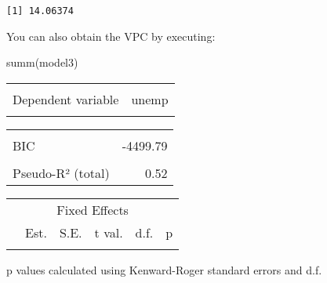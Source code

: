 \documentclass[
  letterpaper,
  krantz2]{style/krantz}
\newenvironment{Shaded}{\begin{snugshade}}{\end{snugshade}}
\newcommand{\FunctionTok}[1]{\textcolor[rgb]{0.28,0.35,0.67}{#1}}
\newcommand{\NormalTok}[1]{\textcolor[rgb]{0.00,0.23,0.31}{#1}}
\begin{document}
\begin{verbatim}
[1] 14.06374
\end{verbatim}

You can also obtain the VPC by executing:

\begin{Shaded}
\begin{Highlighting}[]
\FunctionTok{summ}\NormalTok{(model3)}
\end{Highlighting}
\end{Shaded}

\begin{table}[!h]
\centering
\begin{tabular}{lr}
\toprule
\cellcolor{gray!6}{Observations} & \cellcolor{gray!6}{1584}\\
Dependent variable & unemp\\
\cellcolor{gray!6}{Type} & \cellcolor{gray!6}{Mixed effects linear regression}\\
\bottomrule
\end{tabular}
\end{table} \begin{table}[!h]
\centering
\begin{tabular}{lr}
\toprule
\cellcolor{gray!6}{AIC} & \cellcolor{gray!6}{-4521.26}\\
BIC & -4499.79\\
\cellcolor{gray!6}{Pseudo-R² (fixed effects)} & \cellcolor{gray!6}{0.00}\\
Pseudo-R² (total) & 0.52\\
\bottomrule
\end{tabular}
\end{table} \begin{table}[!h]
\centering
\begin{threeparttable}
\begin{tabular}{lrrrrr}
\toprule
\multicolumn{6}{c}{Fixed Effects} \\
\cmidrule(l{3pt}r{3pt}){1-6}
  & Est. & S.E. & t val. & d.f. & p\\
\midrule
\cellcolor{gray!6}{(Intercept)} & \cellcolor{gray!6}{0.12} & \cellcolor{gray!6}{0.01} & \cellcolor{gray!6}{18.63} & \cellcolor{gray!6}{59.98} & \cellcolor{gray!6}{0.00}\\
\bottomrule
\end{tabular}
\begin{tablenotes}
\item  p values calculated using Kenward-Roger standard errors and d.f. 
\end{tablenotes}

\end{threeparttable}
\end{table}
\end{document}
